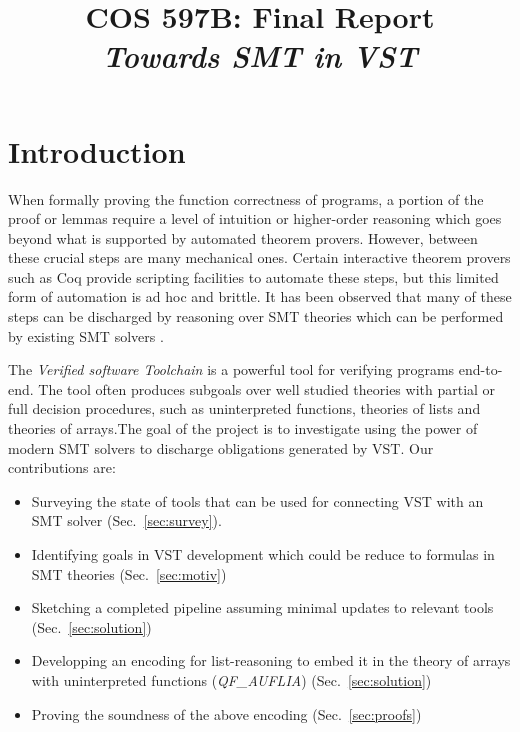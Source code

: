 \documentclass[onecolumn, preprint]{sigplanconf}
\title{COS 597B: Final Report\\
\emph{Towards SMT in VST}}
\begin{document}
\maketitle


\section{Introduction}
When formally proving the function correctness of programs, a portion of the proof or lemmas require a level of intuition or higher-order reasoning which goes beyond what is supported by automated theorem provers. However, between these crucial steps are many mechanical ones. Certain interactive theorem provers such as Coq provide scripting facilities to automate these steps, but this limited form of automation is ad hoc and brittle. It has been observed that many of these steps can be discharged by reasoning over SMT theories which can be performed by existing SMT solvers \citep{appelnote}. 

The \emph{Verified software Toolchain} is a powerful tool for verifying programs end-to-end. %
The tool often produces subgoals over well studied theories with partial or full decision procedures, such as uninterpreted functions, theories of lists and theories of arrays.The goal of the project is to investigate using the power of modern SMT solvers to discharge obligations generated by VST. Our contributions are:
\begin{itemize}
\item Surveying the state of tools that can be used for connecting VST with an SMT solver (Sec.~\ref{sec:survey}). %
 \item Identifying goals in VST development which could be reduce to formulas in SMT theories (Sec.~\ref{sec:motiv})
 \item Sketching a completed pipeline assuming minimal updates to relevant tools (Sec.~\ref{sec:solution})
 \item Developping an encoding for list-reasoning to embed it in the theory of arrays with uninterpreted functions (\emph{QF\_AUFLIA}) (Sec.~\ref{sec:solution})
 \item Proving the soundness of the above encoding (Sec.~\ref{sec:proofs})
\end{itemize}
\end{document}
